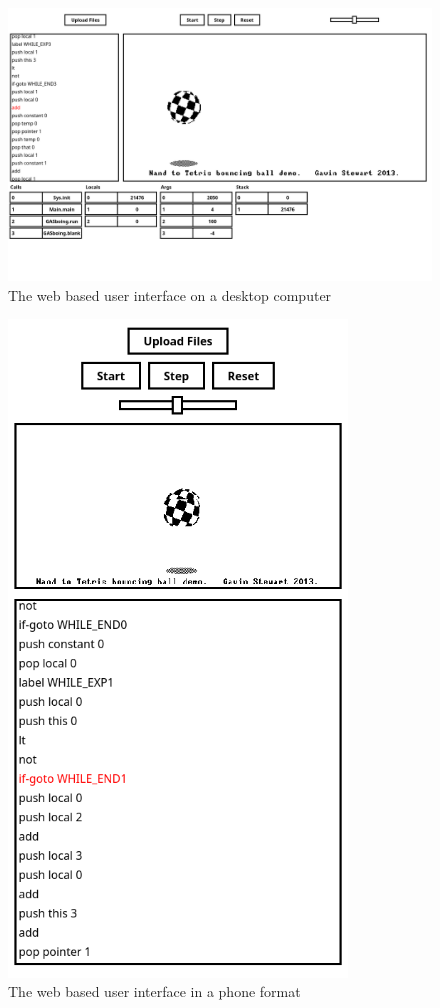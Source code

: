 \begin{center}
  \begin{figure}[h]
    \includegraphics[width=16cm]{fig/ui-demo-desktop.png}
    \caption{The web based user interface on a desktop computer}%
    \label{fig:ui-demo-desktop}
  \end{figure}
\end{center}

\begin{center}
  \begin{figure}[h]
    \includegraphics[width=9cm]{fig/ui-demo-mobile.png}
    \caption{The web based user interface in a phone format}%
    \label{fig:ui-demo-mobile}
  \end{figure}
\end{center}


